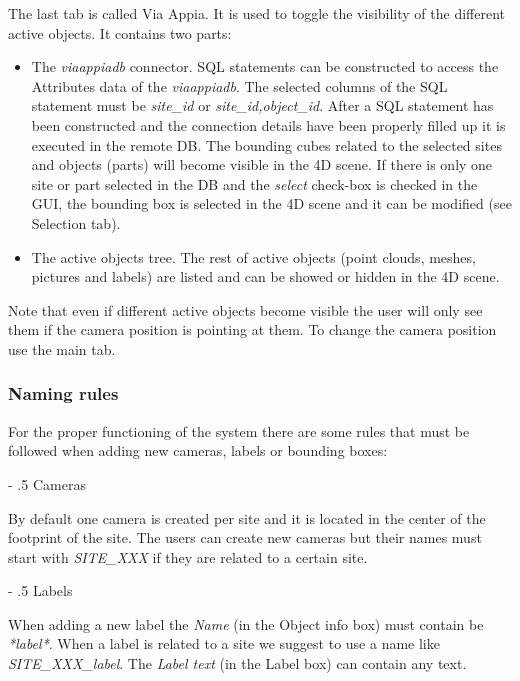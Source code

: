 \documentclass[a4paper,11pt]{article}
\makeatletter
\renewcommand\paragraph{%
   \@startsection{paragraph}{4}{0mm}%
      {-\baselineskip}%
      {.5\baselineskip}%
      {\normalfont\normalsize\bfseries}}
\makeatother
\begin{document}
The last tab is called Via Appia. It is used to toggle the visibility of the different active objects. It contains two parts: 
\begin{itemize}
	\item The \textit{viaappiadb} connector. SQL statements can be constructed to access the Attributes data of the \textit{viaappiadb}. The selected columns of the SQL statement must be \textit{site\_id} or \textit{site\_id,object\_id}. After a SQL statement has been constructed and the connection details have been properly filled up it is executed in the remote DB. The bounding cubes related to the selected sites and objects (parts) will become visible in the 4D scene. If there is only one site or part selected in the DB and the \textit{select} check-box is checked in the GUI, the bounding box is selected in the 4D scene and it can be modified (see Selection tab).
	\item The active objects tree. The rest of active objects (point clouds, meshes, pictures and labels) are listed and can be showed or hidden in the 4D scene.
\end{itemize}

Note that even if different active objects become visible the user will only see them if the camera position is pointing at them. To change the camera position use the main tab.

\subsubsection{Naming rules}
\label{sec:guiname}

For the proper functioning of the system there are some rules that must be followed when adding new cameras, labels or bounding boxes:

\paragraph{Cameras}

By default one camera is created per site and it is located in the center of the footprint of the site. The users can create new cameras but their names must start with \textit{SITE\_XXX} if they are related to a certain site.

\paragraph{Labels}
 
When adding a new label the \textit{Name} (in the Object info box) must contain be \textit{*label*}. When a label is related to a site we suggest to use a name like \textit{SITE\_XXX\_label}. The \textit{Label text} (in the Label box) can contain any text.
\end{document}
